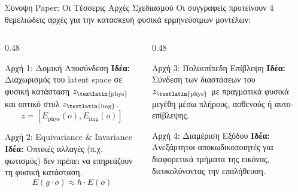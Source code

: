 \documentclass[10pt, aspectratio=169]{beamer}
\begin{document}
\begin{frame}{Σύνοψη Paper: Οι Τέσσερις Αρχές Σχεδιασμού}
    \footnotesize Οι συγγραφείς προτείνουν 4 θεμελιώδεις αρχές για την κατασκευή φυσικά ερμηνεύσιμων μοντέλων:\par\vspace{0.2cm}
    \begin{columns}[onlytextwidth, T]
        \begin{column}{0.48\textwidth}
            \begin{block}{Αρχή 1: Δομική Αποσύνδεση}
                \scriptsize \textbf{Ιδέα:} Διαχωρισμός του \textlatin{latent space} σε φυσική κατάσταση $z_{\text{\textlatin{phys}}}$ και οπτικό στυλ $z_{\text{\textlatin{img}}}$.
                \[ z = [E_{\text{phys}}(o), E_{\text{img}}(o)] \]
            \end{block}
            \begin{block}{Αρχή 2: Equivariance \& Invariance}
                \scriptsize \textbf{Ιδέα:} Οπτικές αλλαγές (π.χ. φωτισμός) δεν πρέπει να επηρεάζουν τη φυσική κατάσταση.
                \[ E(g \cdot o) \approx h \cdot E(o) \]
            \end{block}
        \end{column}
        \begin{column}{0.48\textwidth}
            \begin{block}{Αρχή 3: Πολυεπίπεδη Επίβλεψη}
                \scriptsize \textbf{Ιδέα:} Σύνδεση των διαστάσεων του $z_{\text{\textlatin{phys}}}$ με πραγματικά φυσικά μεγέθη μέσω πλήρους, ασθενούς ή αυτο-επίβλεψης.
            \end{block}
            \begin{block}{Αρχή 4: Διαμέριση Εξόδου}
                \scriptsize \textbf{Ιδέα:} Ανεξάρτητοι αποκωδικοποιητές για διαφορετικά τμήματα της εικόνας, διευκολύνοντας την επαλήθευση.
            \end{block}
        \end{column}
    \end{columns}
\end{frame}

\end{document}
